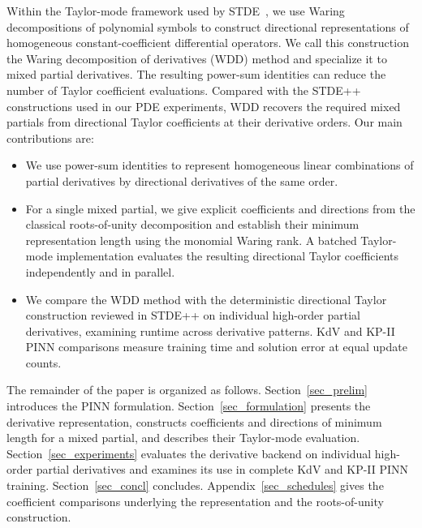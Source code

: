 \documentclass[final,oneeqnum]{siamltex}
\begin{document}
Within the Taylor-mode framework used by STDE~\cite{Shi2024stde}, we use Waring decompositions of polynomial symbols to construct directional representations of homogeneous constant-coefficient differential operators.
We call this construction the Waring decomposition of derivatives (WDD) method and specialize it to mixed partial derivatives.
The resulting power-sum identities can reduce the number of Taylor coefficient evaluations.
Compared with the STDE++ constructions used in our PDE experiments, WDD recovers the required mixed partials from directional Taylor coefficients at their derivative orders.
Our main contributions are:
\begin{itemize}[leftmargin=1.2em, itemindent=0pt, labelsep=0.5em,
        itemsep=0.35em, topsep=0.45em, parsep=0pt]
    \item We use power-sum identities to represent homogeneous linear combinations of partial derivatives by directional derivatives of the same order.
    \item For a single mixed partial, we give explicit coefficients and directions from the classical roots-of-unity decomposition and establish their minimum representation length using the monomial Waring rank.
        A batched Taylor-mode implementation evaluates the resulting directional Taylor coefficients independently and in parallel.
    \item We compare the WDD method with the deterministic directional Taylor construction reviewed in STDE++ on individual high-order partial derivatives, examining runtime across derivative patterns.
        KdV and KP-II PINN comparisons measure training time and solution error at equal update counts.
\end{itemize}

The remainder of the paper is organized as follows.
Section~\ref{sec_prelim} introduces the PINN formulation.
Section~\ref{sec_formulation} presents the derivative representation, constructs coefficients and directions of minimum length for a mixed partial, and describes their Taylor-mode evaluation.
Section~\ref{sec_experiments} evaluates the derivative backend on individual high-order partial derivatives and examines its use in complete KdV and KP-II PINN training.
Section~\ref{sec_concl} concludes.
Appendix~\ref{sec_schedules} gives the coefficient comparisons underlying the representation and the roots-of-unity construction.

\end{document}
